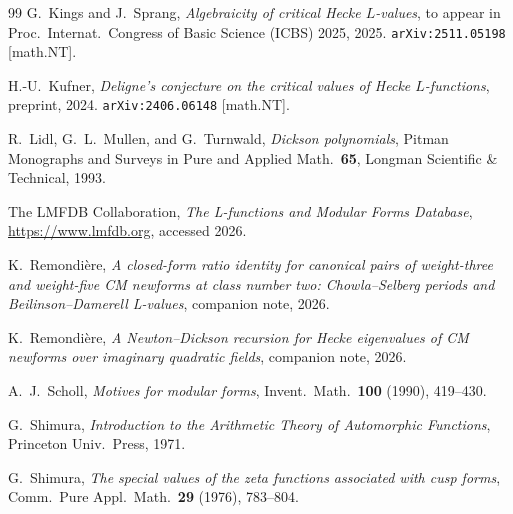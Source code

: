 \documentclass[11pt,a4paper]{amsart}
\theoremstyle{plain}
\theoremstyle{definition}
\begin{document}
\begin{thebibliography}{99}
G.~Kings and J.~Sprang,
\textit{Algebraicity of critical Hecke $L$-values},
to appear in Proc.\ Internat.\ Congress of Basic Science (ICBS) 2025, 2025.
\texttt{arXiv:2511.05198} [math.NT].

H.-U.~Kufner,
\textit{Deligne's conjecture on the critical values of Hecke $L$-functions},
preprint, 2024.
\texttt{arXiv:2406.06148} [math.NT].

R.~Lidl, G.~L.~Mullen, and G.~Turnwald,
\emph{Dickson polynomials},
Pitman Monographs and Surveys in Pure and Applied Math.\ \textbf{65},
Longman Scientific \& Technical, 1993.

The LMFDB Collaboration,
\emph{The L-functions and Modular Forms Database},
\url{https://www.lmfdb.org}, accessed 2026.

K.~Remondi\`ere,
\textit{A closed-form ratio identity for canonical pairs of weight-three
and weight-five CM newforms at class number two: Chowla--Selberg periods and
Beilinson--Damerell L-values},
companion note, 2026.

K.~Remondi\`ere,
\textit{A Newton--Dickson recursion for Hecke eigenvalues of CM newforms
over imaginary quadratic fields},
companion note, 2026.

A.~J.~Scholl,
\textit{Motives for modular forms},
Invent.\ Math.\ \textbf{100} (1990), 419--430.

G.~Shimura,
\emph{Introduction to the Arithmetic Theory of Automorphic Functions},
Princeton Univ.\ Press, 1971.

G.~Shimura,
\textit{The special values of the zeta functions associated with cusp forms},
Comm.\ Pure Appl.\ Math.\ \textbf{29} (1976), 783--804.

\end{thebibliography}
\end{document}
